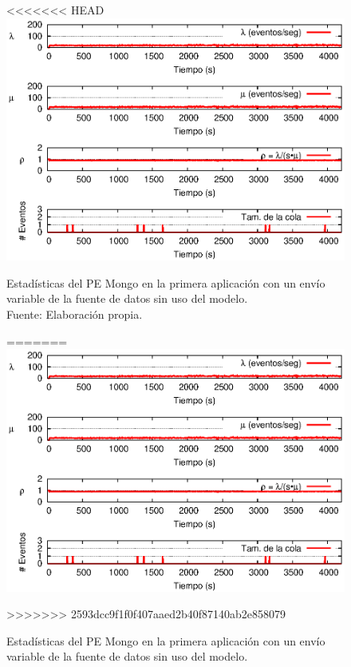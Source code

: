\begin{figure}[!ht]
<<<<<<< HEAD
    \centering
    \captionsetup{justification=centering}
    \includegraphics[scale=1]{images/exp/app1/normal/sm/statusMongoPE.eps}
    \caption[Estadísticas del PE Mongo en la primera aplicación con un envío variable de la fuente de datos sin uso del modelo.]{Estadísticas del PE Mongo en la primera aplicación con un envío variable de la fuente de datos sin uso del modelo.\\Fuente: Elaboración propia.}
=======
\centering
    \includegraphics[scale=1.1]{images/exp/app1/normal/sm/statusMongoPE.eps}
    \caption{Estad\'isticas del PE Mongo en la primera aplicaci\'on con un env\'io variable de la fuente de datos sin uso del modelo.}
>>>>>>> 2593dcc9f1f0f407aaed2b40f87140ab2e858079
    \label{fig:app1-normal-statusMongoPE-sm}
\end{figure}

